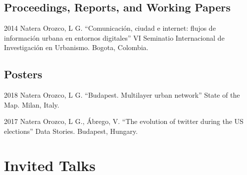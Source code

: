 \documentclass{academiccv}
\begin{document}
\subsection*{Proceedings, Reports, and Working Papers}

\begin{tablist}

\item[2014] \tab Natera Orozco, L G. \enquote{Comunicación, ciudad e internet: flujos de información urbana en entornos digitales} VI Seminatio Internacional de Investigación en Urbanismo. Bogota, Colombia.
	
\end{tablist}





	

\subsection*{Posters}

\begin{tablist}
	
	\item[2018] \tab Natera Orozco, L G. \enquote{Budapest. Multilayer urban network} State of the Map. Milan, Italy.
	\item[2017] \tab Natera Orozco, L G., Ábrego, V. \enquote{The evolution of twitter during the US elections} Data Stories. Budapest, Hungary.
	
\end{tablist}


\section*{Invited Talks}
\end{document}
